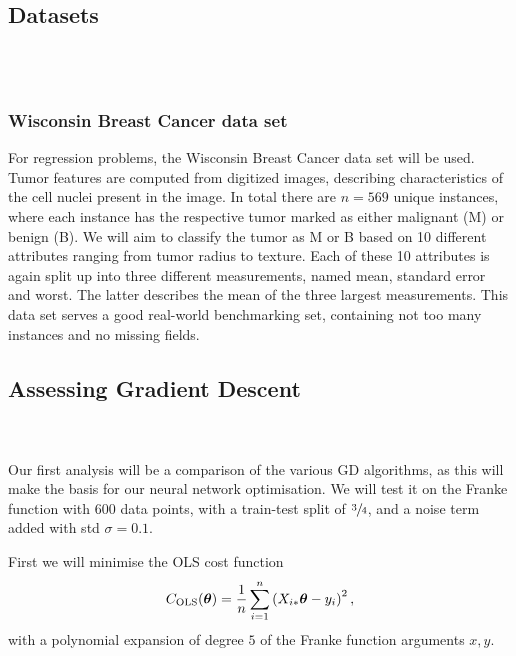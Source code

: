 \\
\subsection{Datasets}
    \\
    \\

    \subsubsection*{Wisconsin Breast Cancer data set}\label{sec:breast_cancer}
    For regression problems, the Wisconsin Breast Cancer data set \cite{Dua:2019} will be used. Tumor features are computed from digitized images, describing characteristics of the cell nuclei present in the image. In total there are $n = 569$ unique instances, where each instance has the respective tumor marked as either malignant (M) or benign (B). We will aim to classify the tumor as M or B based on 10 different attributes ranging from tumor radius to texture. Each of these 10 attributes is again split up into three different measurements, named mean, standard error and worst. The latter describes the mean of the three largest measurements. This data set serves a good real-world benchmarking set, containing not too many instances and no missing fields.  

\subsection{Assessing Gradient Descent}
    \\
    \\
    Our first analysis will be a comparison of the various GD algorithms, as this will make the basis for our neural network optimisation. We will test it on the Franke function with 600 data points, with a train-test split of $\sfrac{3}{4}$, and a noise term added with std $\sigma=0.1$.

    First we will minimise the OLS cost function
    \begin{align}
        {C}_\text{OLS}(\boldsymbol{\theta}) = \frac{1}{n}\sum_{i=1}^n \left(X_{i*}\boldsymbol{\theta} - y_i\right)^2,
    \end{align}
    with a polynomial expansion of degree $5$ of the Franke function arguments $x,y$. 

